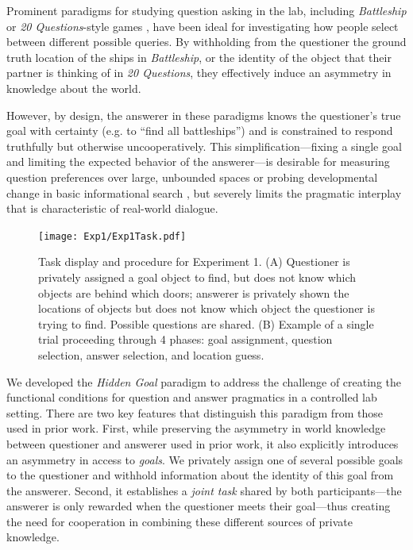 \documentclass[11pt, floatsintext]{apa6}
\begin{document}
Prominent paradigms for studying question asking in the lab, including \emph{Battleship} \cite{RotheEtAl16_NaturalLanguageQuestions, rothe2018people} or \emph{20 Questions}-style games \cite{Siegler77_TwentyQuestions, cohen2016searching, NelsonDivjak___Meder14_GuessWho, RuggeriEtAl15_HierarchicalTwentyQs}, have been ideal for investigating how people select between different possible queries.
By withholding from the questioner the ground truth location of the ships in \emph{Battleship}, or the identity of the object that their partner is thinking of in \emph{20 Questions}, they effectively induce an asymmetry in knowledge about the world.

However, by design, the answerer in these paradigms knows the questioner's true goal with certainty (e.g. to ``find all battleships'') and is constrained to respond truthfully but otherwise uncooperatively.
This simplification---fixing a single goal and limiting the expected behavior of the answerer---is desirable for measuring question preferences over large, unbounded spaces \cite{cohen2016searching, rothe2017question} or probing developmental change in basic informational search \cite{RuggeriEtAl15_HierarchicalTwentyQs, ruggeri2016sources}, but severely limits the pragmatic interplay that is characteristic of real-world dialogue. 

\begin{figure}[t!]
\begin{center}
\texttt{[image: Exp1/Exp1Task.pdf]}
\end{center}
\caption{\footnotesize Task display and procedure for Experiment 1. (A) Questioner is privately assigned a goal object to find, but does not know which objects are behind which doors; answerer is privately shown the locations of objects but does not know which object the questioner is trying to find. Possible questions are shared. (B) Example of a single trial proceeding through 4 phases: goal assignment, question selection, answer selection, and location guess.}
\label{fig:expviews}
\end{figure}


We developed the \emph{Hidden Goal} paradigm to address the challenge of creating the functional conditions for question and answer pragmatics in a controlled lab setting.
There are two key features that distinguish this paradigm from those used in prior work.
First, while preserving the asymmetry in world knowledge between questioner and answerer used in prior work, it also explicitly introduces an asymmetry in access to \emph{goals}.
We privately assign one of several possible goals to the questioner and withhold information about the identity of this goal from the answerer. 
Second, it establishes a \emph{joint task} shared by both participants---the answerer is only rewarded when the questioner meets their goal---thus creating the need for cooperation in combining these different sources of private knowledge. 
\end{document}

